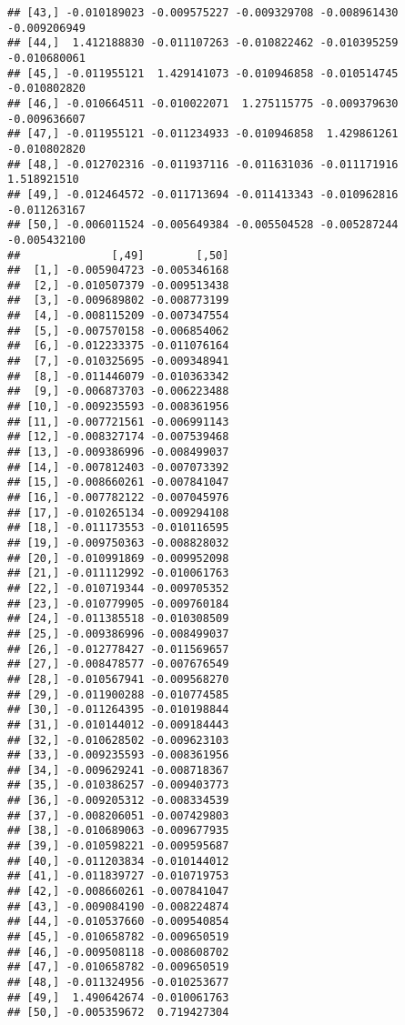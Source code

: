 \documentclass[
]{article}
\begin{document}
\begin{verbatim}
## [43,] -0.010189023 -0.009575227 -0.009329708 -0.008961430 -0.009206949
## [44,]  1.412188830 -0.011107263 -0.010822462 -0.010395259 -0.010680061
## [45,] -0.011955121  1.429141073 -0.010946858 -0.010514745 -0.010802820
## [46,] -0.010664511 -0.010022071  1.275115775 -0.009379630 -0.009636607
## [47,] -0.011955121 -0.011234933 -0.010946858  1.429861261 -0.010802820
## [48,] -0.012702316 -0.011937116 -0.011631036 -0.011171916  1.518921510
## [49,] -0.012464572 -0.011713694 -0.011413343 -0.010962816 -0.011263167
## [50,] -0.006011524 -0.005649384 -0.005504528 -0.005287244 -0.005432100
##              [,49]        [,50]
##  [1,] -0.005904723 -0.005346168
##  [2,] -0.010507379 -0.009513438
##  [3,] -0.009689802 -0.008773199
##  [4,] -0.008115209 -0.007347554
##  [5,] -0.007570158 -0.006854062
##  [6,] -0.012233375 -0.011076164
##  [7,] -0.010325695 -0.009348941
##  [8,] -0.011446079 -0.010363342
##  [9,] -0.006873703 -0.006223488
## [10,] -0.009235593 -0.008361956
## [11,] -0.007721561 -0.006991143
## [12,] -0.008327174 -0.007539468
## [13,] -0.009386996 -0.008499037
## [14,] -0.007812403 -0.007073392
## [15,] -0.008660261 -0.007841047
## [16,] -0.007782122 -0.007045976
## [17,] -0.010265134 -0.009294108
## [18,] -0.011173553 -0.010116595
## [19,] -0.009750363 -0.008828032
## [20,] -0.010991869 -0.009952098
## [21,] -0.011112992 -0.010061763
## [22,] -0.010719344 -0.009705352
## [23,] -0.010779905 -0.009760184
## [24,] -0.011385518 -0.010308509
## [25,] -0.009386996 -0.008499037
## [26,] -0.012778427 -0.011569657
## [27,] -0.008478577 -0.007676549
## [28,] -0.010567941 -0.009568270
## [29,] -0.011900288 -0.010774585
## [30,] -0.011264395 -0.010198844
## [31,] -0.010144012 -0.009184443
## [32,] -0.010628502 -0.009623103
## [33,] -0.009235593 -0.008361956
## [34,] -0.009629241 -0.008718367
## [35,] -0.010386257 -0.009403773
## [36,] -0.009205312 -0.008334539
## [37,] -0.008206051 -0.007429803
## [38,] -0.010689063 -0.009677935
## [39,] -0.010598221 -0.009595687
## [40,] -0.011203834 -0.010144012
## [41,] -0.011839727 -0.010719753
## [42,] -0.008660261 -0.007841047
## [43,] -0.009084190 -0.008224874
## [44,] -0.010537660 -0.009540854
## [45,] -0.010658782 -0.009650519
## [46,] -0.009508118 -0.008608702
## [47,] -0.010658782 -0.009650519
## [48,] -0.011324956 -0.010253677
## [49,]  1.490642674 -0.010061763
## [50,] -0.005359672  0.719427304
\end{verbatim}
\end{document}

